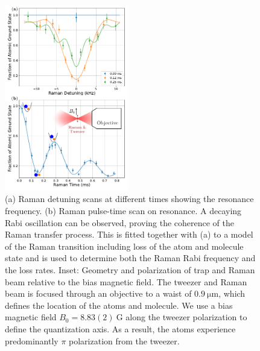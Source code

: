 \documentclass[aps,prl,twocolumn,10pt,superscriptaddress]{revtex4-1}
\begin{document}
\begin{figure}[ht!]
  \includegraphics[width=0.48\textwidth]{imgs/fig-raman.pdf}
  \caption{
    (a) Raman detuning scans at different times showing the resonance frequency.
    (b) Raman pulse-time scan on resonance.
    A decaying Rabi oscillation can be observed, proving the coherence of
    the Raman transfer process.
    This is fitted together with (a) to a model of the Raman transition including loss of the atom and molecule state and is used to determine
    both the Raman Rabi frequency and the loss rates.
    Inset: Geometry and polarization of trap and Raman beam relative to the bias magnetic field.
    The tweezer and Raman beam is focused through an objective to a waist of $0.9~\mathrm{\mu m}$,
    which defines the location of the atoms and molecule.
    We use a bias magnetic field $B_0=8.83(2)~\mathrm{G}$ along the tweezer polarization
    to define the quantization axis.
    As a result, the atoms experience predominantly $\pi$ polarization from the tweezer.
    \label{f-raman}}
\end{figure}
\end{document}
